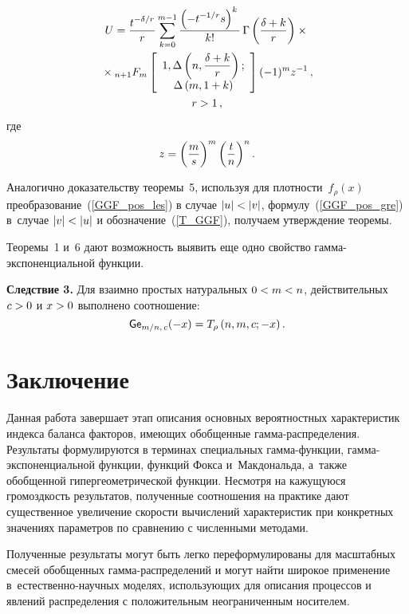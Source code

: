 \begin{multicols}{2}
    \noindent
\begin{multline}
U = \fr{t^{-\delta/r}}{r}\sum\limits_{k=0}^{m-1}\fr{\left(-t^{-1/r}s\right)^k}{k!}
\,\Gamma\left( \fr{\delta+k}{r} \right)\times{}\\
{}\times
    {}_{n+1}F_{m}\left[
    \begin{array}{c}
    1, \Delta\left(n,\fr{\delta + k}{r}\right); \\
    \Delta \left( m, 1+k\right)
    \end{array}\right]%
    (-1)^m z^{-1}\,,\\
     r>1\,, 
    \label{GGF_pos_gre}
    \end{multline}
где
$$ 
z = \left( \displaystyle\frac{\displaystyle m\mathstrut}{\displaystyle s\mathstrut} \right)^m \left( \displaystyle\frac{\displaystyle t\mathstrut}{\displaystyle n\mathstrut} \right)^n. 
$$

Аналогично доказательству теоремы~5, используя для плотности~$f_\rho(x)$ 
преобразование~(\ref{GGF_pos_les}) в случае $|u|\hm<|v|$, формулу~(\ref{GGF_pos_gre}) 
в~случае $|v|\hm<|u|$ и обозначение~(\ref{T_GGF}), получаем утверждение теоремы.

\smallskip

Теоремы~1 и~6 дают возможность выявить еще одно свойство гам\-ма-экс\-по\-нен\-ци\-аль\-ной функции.

\smallskip

\noindent
\textbf{Следствие 3.}
Для взаимно простых натуральных $0\hm<m\hm<n$, действительных $c\hm>0$ и $x\hm>0$ выполнено соотношение:
$$
{\sf Ge}_{m/n,\, c}(-x) = T_\rho\left(n, m, c; -x\right).
$$



\section{Заключение}


Данная работа завершает этап описания основных вероятностных характеристик индекса баланса факторов, 
име\-ющих обобщенные гам\-ма-рас\-пре\-де\-ле\-ния. 
Результаты формулируются в терминах специальных гам\-ма-функ\-ции, гам\-ма-экс\-по\-нен\-ци\-аль\-ной функции, 
функций Фокса и~Макдональда, а~также обобщенной гипергеометрической функции. 
Несмотря на кажущуюся громоздкость результатов, полученные соотношения на практике 
дают существенное увеличение скорости вычислений характеристик при конкретных 
значениях параметров по сравнению с численными методами.

Полученные результаты могут быть легко переформулированы для масштабных 
смесей обобщенных гам\-ма-рас\-пре\-де\-ле\-ний и могут найти широкое применение в~естественно-на\-уч\-ных моделях, 
использующих для описания процессов и явлений распределения с положительным неограниченным носителем.


\end{multicols}
